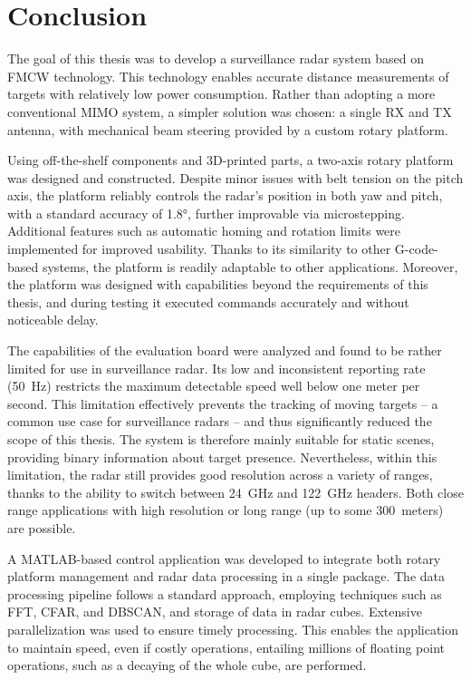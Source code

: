 \chapter*{Conclusion}

The goal of this thesis was to develop a surveillance radar system based on FMCW technology.
This technology enables accurate distance measurements of targets with relatively low power consumption.
Rather than adopting a more conventional MIMO system, a simpler solution was chosen: a single RX and TX antenna, with mechanical beam steering provided by a custom rotary platform.

Using off-the-shelf components and 3D-printed parts, a two-axis rotary platform was designed and constructed.
Despite minor issues with belt tension on the pitch axis, the platform reliably controls the radar’s position in both yaw and pitch, with a standard accuracy of 1.8°, further improvable via microstepping.
Additional features such as automatic homing and rotation limits were implemented for improved usability.
Thanks to its similarity to other G-code-based systems, the platform is readily adaptable to other applications.
Moreover, the platform was designed with capabilities beyond the requirements of this thesis, and during testing it executed commands accurately and without noticeable delay.

The capabilities of the \sidar evaluation board were analyzed and found to be rather limited for use in surveillance radar.
Its low and inconsistent reporting rate (50~Hz) restricts the maximum detectable speed well below one meter per second.
This limitation effectively prevents the tracking of moving targets -- a common use case for surveillance radars -- and thus significantly reduced the scope of this thesis.
The system is therefore mainly suitable for static scenes, providing binary information about target presence.
Nevertheless, within this limitation, the radar still provides good resolution across a variety of ranges, thanks to the ability to switch between 24~GHz and 122~GHz headers.
Both close range applications with high resolution or long range (up to some 300~meters) are possible.

A MATLAB-based control application was developed to integrate both rotary platform management and radar data processing in a single package.
The data processing pipeline follows a standard approach, employing techniques such as FFT, CFAR, and DBSCAN, and storage of data in radar cubes.
Extensive parallelization was used to ensure timely processing.
This enables the application to maintain speed, even if costly operations, entailing millions of floating point operations, such as a decaying of the whole cube, are performed.

